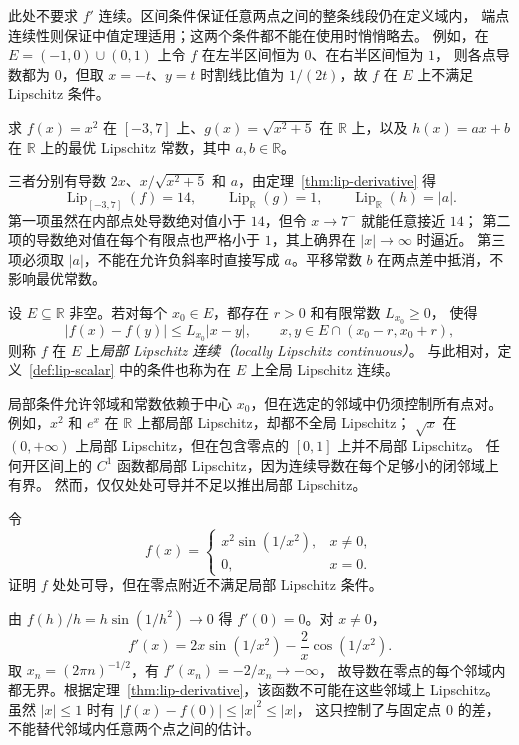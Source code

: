 \documentclass[UTF8,12pt,a4paper,fontset=fandol]{ctexart}
\begin{document}
此处不要求 $f'$ 连续。区间条件保证任意两点之间的整条线段仍在定义域内，
端点连续性则保证中值定理适用；这两个条件都不能在使用时悄悄略去。
例如，在 $E=(-1,0)\cup(0,1)$ 上令 $f$ 在左半区间恒为 $0$、在右半区间恒为 $1$，
则各点导数都为 $0$，但取 $x=-t$、$y=t$ 时割线比值为 $1/(2t)$，故 $f$ 在 $E$ 上不满足 Lipschitz 条件。

\begin{example}\label{ex:lip-constants}
求 $f(x)=x^2$ 在 $[-3,7]$ 上、$g(x)=\sqrt{x^2+5}$ 在 $\mathbb R$ 上，以及
$h(x)=ax+b$ 在 $\mathbb R$ 上的最优 Lipschitz 常数，其中 $a,b\in\mathbb R$。
\end{example}
\begin{solve}
三者分别有导数 $2x$、$x/\sqrt{x^2+5}$ 和 $a$，由定理~\ref{thm:lip-derivative} 得
\[
  \operatorname{Lip}_{[-3,7]}(f)=14,\qquad
  \operatorname{Lip}_{\mathbb R}(g)=1,\qquad
  \operatorname{Lip}_{\mathbb R}(h)=|a|.
\]
第一项虽然在内部点处导数绝对值小于 $14$，但令 $x\to7^-$ 就能任意接近 $14$；
第二项的导数绝对值在每个有限点也严格小于 $1$，其上确界在 $|x|\to\infty$ 时逼近。
第三项必须取 $|a|$，不能在允许负斜率时直接写成 $a$。平移常数 $b$ 在两点差中抵消，不影响最优常数。
\end{solve}

\begin{definition}\label{def:lip-local}
设 $E\subseteq\mathbb R$ 非空。若对每个 $x_0\in E$，都存在 $r>0$ 和有限常数 $L_{x_0}\ge0$，
使得
\[
  |f(x)-f(y)|\le L_{x_0}|x-y|,
  \qquad x,y\in E\cap(x_0-r,x_0+r),
\]
则称 $f$ 在 $E$ 上\emph{局部 Lipschitz 连续（locally Lipschitz continuous）}。
与此相对，定义~\ref{def:lip-scalar} 中的条件也称为在 $E$ 上全局 Lipschitz 连续。
\end{definition}

局部条件允许邻域和常数依赖于中心 $x_0$，但在选定的邻域中仍须控制所有点对。
例如，$x^2$ 和 $e^x$ 在 $\mathbb R$ 上都局部 Lipschitz，却都不全局 Lipschitz；
$\sqrt x$ 在 $(0,+\infty)$ 上局部 Lipschitz，但在包含零点的 $[0,1]$ 上并不局部 Lipschitz。
任何开区间上的 $C^1$ 函数都局部 Lipschitz，因为连续导数在每个足够小的闭邻域上有界。
然而，仅仅处处可导并不足以推出局部 Lipschitz。

\begin{example}\label{ex:lip-differentiable-not-local}
令
\[
  f(x)=
  \begin{cases}
    x^2\sin(1/x^2),&x\ne0,\\
    0,&x=0.
  \end{cases}
\]
证明 $f$ 处处可导，但在零点附近不满足局部 Lipschitz 条件。
\end{example}
\begin{solve}
由 $f(h)/h=h\sin(1/h^2)\to0$ 得 $f'(0)=0$。对 $x\ne0$，
\[
  f'(x)=2x\sin(1/x^2)-\frac2x\cos(1/x^2).
\]
取 $x_n=(2\pi n)^{-1/2}$，有 $f'(x_n)=-2/x_n\to-\infty$，
故导数在零点的每个邻域内都无界。根据定理~\ref{thm:lip-derivative}，该函数不可能在这些邻域上 Lipschitz。
虽然 $|x|\le1$ 时有 $|f(x)-f(0)|\le|x|^2\le|x|$，
这只控制了与固定点 $0$ 的差，不能替代邻域内任意两个点之间的估计。
\end{solve}
\end{document}
